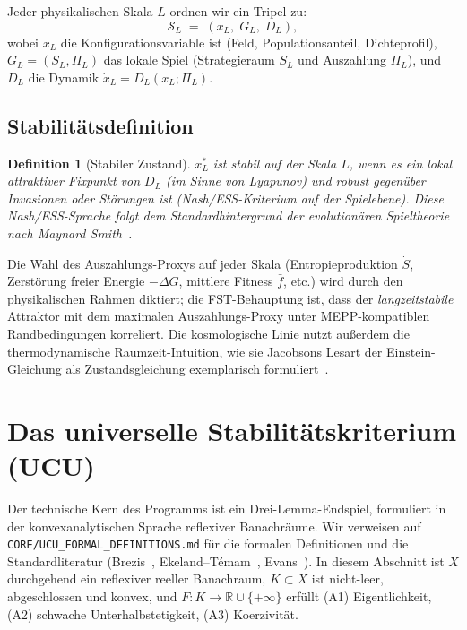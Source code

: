 \documentclass[11pt,a4paper]{article}
\newtheorem{definition}{Definition}
\theoremstyle{remark}
\begin{document}
Jeder physikalischen Skala $L$ ordnen wir ein Tripel zu:
\[
\mathcal{S}_L \;=\; (x_L,\; G_L,\; D_L),
\]
wobei $x_L$ die Konfigurationsvariable ist (Feld, Populationsanteil, Dichteprofil), $G_L = (S_L, \Pi_L)$ das lokale Spiel (Strategieraum $S_L$ und Auszahlung $\Pi_L$), und $D_L$ die Dynamik $\dot{x}_L = D_L(x_L; \Pi_L)$.

\subsection{Stabilitätsdefinition}

\begin{definition}[Stabiler Zustand]
$x_L^*$ ist \emph{stabil} auf der Skala $L$, wenn es ein lokal attraktiver Fixpunkt von $D_L$ (im Sinne von Lyapunov) und robust gegenüber Invasionen oder Störungen ist (Nash/ESS-Kriterium auf der Spielebene).
Diese Nash/ESS-Sprache folgt dem Standardhintergrund der evolutionären Spieltheorie nach Maynard Smith~\cite{MaynardSmith1982}.
\end{definition}

Die Wahl des Auszahlungs-Proxys auf jeder Skala (Entropieproduktion $\dot S$, Zerstörung freier Energie $-\Delta G$, mittlere Fitness $\bar f$, etc.) wird durch den physikalischen Rahmen diktiert; die FST-Behauptung ist, dass der \emph{langzeitstabile} Attraktor mit dem maximalen Auszahlungs-Proxy unter MEPP-kompatiblen Randbedingungen korreliert.
Die kosmologische Linie nutzt außerdem die thermodynamische Raumzeit-Intuition, wie sie Jacobsons Lesart der Einstein-Gleichung als Zustandsgleichung exemplarisch formuliert~\cite{Jacobson1995}.

\section{Das universelle Stabilitätskriterium (UCU)}
\label{sec:ucu}

Der technische Kern des Programms ist ein Drei-Lemma-Endspiel, formuliert in der konvexanalytischen Sprache reflexiver Banachräume. Wir verweisen auf \texttt{CORE/UCU\_FORMAL\_DEFINITIONS.md} für die formalen Definitionen und die Standardliteratur (Brezis~\cite{Brezis2011}, Ekeland--T\'emam~\cite{EkelandTemam1999}, Evans~\cite{Evans2010}). In diesem Abschnitt ist $X$ durchgehend ein reflexiver reeller Banachraum, $K \subset X$ ist nicht-leer, abgeschlossen und konvex, und $F : K \to \mathbb{R} \cup \{+\infty\}$ erfüllt (A1) Eigentlichkeit, (A2) schwache Unterhalbstetigkeit, (A3) Koerzivität.
\end{document}
